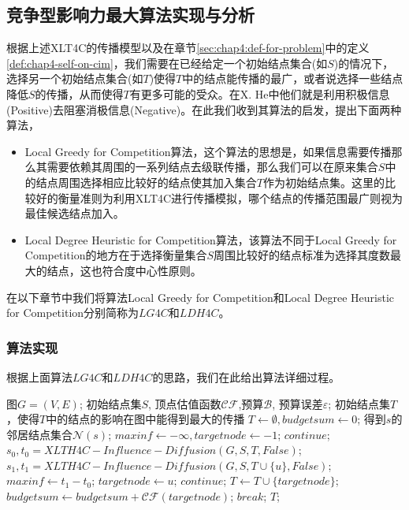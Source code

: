 \subsection{竞争型影响力最大算法实现与分析}
根据上述XLT4C的传播模型以及在章节\ref{sec:chap4:def-for-problem}中的定义\ref{def:chap4-self-on-cim}，我们需要在已经给定一个初始结点集合(如$S$)的情况下，选择另一个初始结点集合(如$T$)使得$T$中的结点能传播的最广，或者说选择一些结点降低$S$的传播，从而使得$T$有更多可能的受众。在X. He\cite{he2012influence}中他们就是利用积极信息(Positive)去阻塞消极信息(Negative)。在此我们收到其算法的启发，提出下面两种算法，
\begin{itemize}
\item Local Greedy for Competition算法，这个算法的思想是，如果信息需要传播那么其需要依赖其周围的一系列结点去级联传播，那么我们可以在原来集合$S$中的结点周围选择相应比较好的结点使其加入集合$T$作为初始结点集。这里的比较好的衡量准则为利用XLT4C进行传播模拟，哪个结点的传播范围最广则视为最佳候选结点加入。
\item Local Degree Heuristic for Competition算法，该算法不同于Local Greedy for Competition的地方在于选择衡量集合$S$周围比较好的结点标准为选择其度数最大的结点，这也符合度中心性原则\cite{bonacich1972factoring}。
\end{itemize}

在以下章节中我们将算法Local Greedy for Competition和Local Degree Heuristic for Competition分别简称为$LG4C$和$LDH4C$。

\subsubsection{算法实现}
根据上面算法$LG4C$和$LDH4C$的思路，我们在此给出算法详细过程。
\begin{algorithm}[H]
	\caption{$LG4C(G, S, \mathcal{CF}, \mathcal{B})$}
	\label{alg:chap4:lg4c-proc}
	\begin{algorithmic}[1]
	\REQUIRE 图$G=(V,E)$; 初始结点集$S$, 顶点估值函数$\mathcal{CF}$,预算$\mathcal{B}$, 预算误差$\varepsilon$;
	\ENSURE 初始结点集$T$，使得$T$中的结点的影响在图中能得到最大的传播
		\STATE $T \leftarrow \emptyset, budgetsum \leftarrow 0$;
			\STATE 得到$s$的邻居结点集合$\mathcal{N}(s)$;
			\STATE $maxinf \leftarrow -\infty,targetnode \leftarrow -1$;
					\STATE $continue$;
				\ENDIF
				\STATE $s_0, t_0 = XLTH4C-Influence-Diffusion(G, S, T, False)$;
				\STATE $s_1, t_1 = XLTH4C-Influence-Diffusion(G, S, T \cup \{u\}, False)$;
					\STATE $maxinf \leftarrow t_1 - t_0$;
					\STATE $targetnode \leftarrow u$;
				\ENDIF
			\ENDFOR
				\STATE $continue$;
			\ENDIF
			\STATE $T \leftarrow T \cup \{targetnode\}$;
			\STATE $budgetsum \leftarrow budgetsum + \mathcal{CF}(targetnode)$;
				\STATE $break$;
			\ENDIF
		\ENDFOR
		\RETURN $T$;
	\end{algorithmic}
\end{algorithm}


